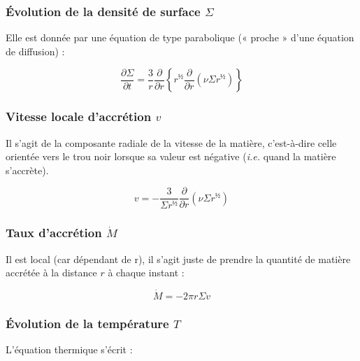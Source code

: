 \subsubsection{\texorpdfstring{Évolution de la densité de surface $\Sigma$}{Évolution de la densité de surface Σ}}

Elle est donnée par une équation de type parabolique (« proche » d’une équation
de diffusion) :

\begin{equation}
    \label{eq:densite_surface}
    \frac{\partial \Sigma}{\partial t} = \frac{3}{r} \frac{\partial}{\partial r} \left\{ r^½ \frac{\partial}{\partial r} \left(\nu \Sigma r^½ \right) \right\}
\end{equation}

\subsubsection{\texorpdfstring{Vitesse locale d’accrétion $v$}{Vitesse locale d’accrétion v}}

Il s’agit de la composante radiale de la vitesse de la matière, c’est-à-dire
celle orientée vers le trou noir lorsque sa valeur est négative (\textit{i.e.}
quand la matière s’accrète).

\begin{equation}
    \label{eq:vitesse_accretion}
    v = - \frac{3}{\Sigma r^½} \frac{\partial}{\partial r} \left( \nu \Sigma r^½ \right)
\end{equation}

\subsubsection{\texorpdfstring{Taux d’accrétion $\dot{M}$}{Taux d’accrétion dM/dt}}

Il est local (car dépendant de r), il s’agit juste de prendre la quantité de
matière accrétée à la distance $r$ à chaque instant :

\begin{equation}
    \label{eq:taux_accretion}
    \dot{M} = - 2 \pi r \Sigma v
\end{equation}

\subsubsection{\texorpdfstring{Évolution de la température $T$}{Évolution de la température \textit{T}}}

L’équation thermique s’écrit :

